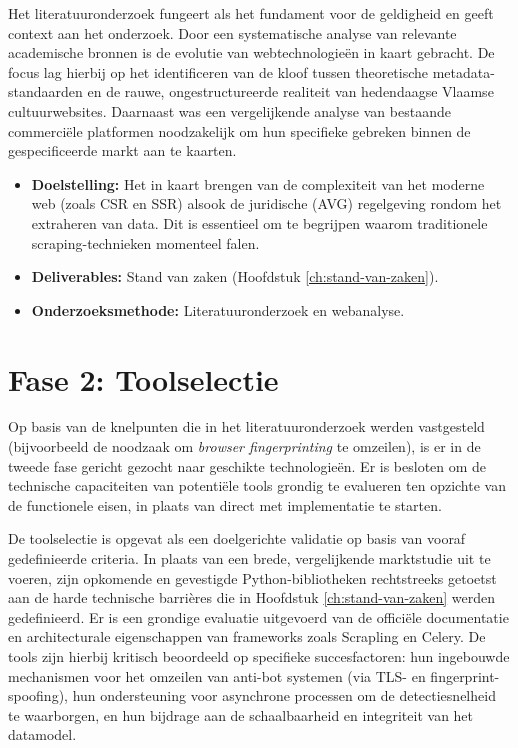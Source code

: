 Het literatuuronderzoek fungeert als het fundament voor de geldigheid en geeft context aan het onderzoek. 
Door een systematische analyse van relevante academische bronnen is de evolutie van webtechnologieën in kaart gebracht. 
De focus lag hierbij op het identificeren van de kloof tussen theoretische metadata-standaarden en de rauwe, ongestructureerde realiteit van hedendaagse Vlaamse cultuurwebsites. 
Daarnaast was een vergelijkende analyse van bestaande commerciële platformen noodzakelijk om hun specifieke gebreken binnen de gespecificeerde markt aan te kaarten.

\begin{itemize}
    \item \textbf{Doelstelling:} Het in kaart brengen van de complexiteit van het moderne web (zoals \gls{CSR} en \gls{SSR}) alsook de juridische (\gls{AVG}) regelgeving rondom het extraheren van data. Dit is essentieel om te begrijpen waarom traditionele scraping-technieken momenteel falen.
    \item \textbf{Deliverables:} Stand van zaken (Hoofdstuk \ref{ch:stand-van-zaken}).
    \item \textbf{Onderzoeksmethode:} Literatuuronderzoek en webanalyse.
\end{itemize}

\section{Fase 2: Toolselectie}
Op basis van de knelpunten die in het literatuuronderzoek werden vastgesteld (bijvoorbeeld de noodzaak om \textit{browser fingerprinting} te omzeilen), 
is er in de tweede fase gericht gezocht naar geschikte technologieën. 
Er is besloten om de technische capaciteiten van potentiële tools grondig te evalueren ten opzichte van de functionele eisen, 
in plaats van direct met implementatie te starten.

De toolselectie is opgevat als een doelgerichte validatie op basis van vooraf gedefinieerde criteria. 
In plaats van een brede, vergelijkende marktstudie uit te voeren, zijn opkomende en 
gevestigde Python-bibliotheken rechtstreeks getoetst aan de harde technische barrières die in Hoofdstuk \ref{ch:stand-van-zaken} werden gedefinieerd. 
Er is een grondige evaluatie uitgevoerd van de officiële documentatie en architecturale eigenschappen van frameworks zoals Scrapling en Celery. 
De tools zijn hierbij kritisch beoordeeld op specifieke succesfactoren: hun ingebouwde mechanismen voor het omzeilen van anti-bot systemen (via TLS- en fingerprint-spoofing), 
hun ondersteuning voor asynchrone processen om de detectiesnelheid te waarborgen, en hun bijdrage aan de schaalbaarheid en integriteit van het datamodel.

